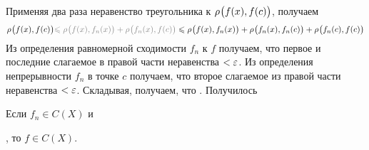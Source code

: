 \begin{prf} %
	Применяя два раза неравенство треугольника к $\rho_{}\bigl(f(x), f(c)\bigr)$, получаем 
	\[\bmetr{f(x), f(c)} \uns{\< \bmetr{f(x), f_n(x)} + \bmetr{f_n(x), f(c)}}\< \bmetr{f(x), f_n(x)} + \bmetr{f_n(x), f_n(c)} + \bmetr{f_n(c), f(c)}\]
	Из определения равномерной сходимости $f_n$ к $f$
	\linebreak
	 получаем, что  первое и последние слагаемое в правой части неравенства $< \varepsilon$. Из определения непрерывности $f_n$ в точке $c$ 
	 получаем, что  второе слагаемое из правой части неравенства $< \varepsilon$. Складывая, получаем, что .
	 Получилось  
\end{prf} %

\begin{slv}[https://www.youtube.com/live/oGN0SkfpZME?si=8DDuSzi86njoQaMf&t=11737]\label{непр.на X}
	Если $f_n \in C(X)$ и\!, то $f \in C(X)$. 
\end{slv} %

